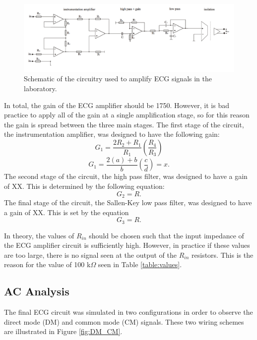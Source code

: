 \documentclass[pdftex,12pt,letterpaper]{article}
\begin{document}
\begin{figure}[H]
\begin{center}
\includegraphics[scale=.35]{ECG_circuit.png}
\caption{Schematic of the circuitry used to amplify ECG signals in the laboratory.}
\label{fig:circuit}
\end{center}
\end{figure}

In total, the gain of the ECG amplifier should be 1750. However, it is bad practice to apply all of the gain at a single amplification stage, so for this reason the gain is spread between the three main stages. The first stage of the circuit, the instrumentation amplifier, was designed to have the following gain:
$$
G_1 = \frac{2R_2+R_1}{R_1}(\frac{R_4}{R_3})
$$
$$
G_1 = \frac{2(a)+b}{b}(\frac{c}{d}) = x.
$$
The second stage of the circuit, the high pass filter,  was designed to have a gain of XX. This is determined by the following equation:
$$
G_2 = R.
$$
The final stage of the circuit, the Sallen-Key low pass filter, was designed to have a gain of XX. This is set by the equation
$$
G_3 = R.
$$

In theory, the values of $R_{in}$ should be chosen such that the input impedance of the ECG amplifier circuit is sufficiently high. However, in practice if these values are too large, there is no signal seen at the output of the $R_{in}$ resistors. This is the reason for the value of 100 k$\Omega$ seen in Table \ref{table:values}.

\subsection{AC Analysis}

The final ECG circuit was simulated in two configurations in order to observe the direct mode (DM) and common mode (CM) signals. These two wiring schemes are illustrated in Figure \ref{fig:DM_CM}.
\end{document}
